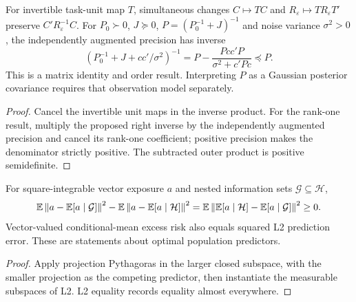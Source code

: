 \begin{theorem}\label{thm:task-precision}
  \leanok
  For invertible task-unit map $T$, simultaneous changes
  $C\mapsto TC$ and $R_\varepsilon\mapsto TR_\varepsilon T'$
  preserve $C'R_\varepsilon^{-1}C$.
  For $P_0\succ0$, $J\succeq0$, $P=(P_0^{-1}+J)^{-1}$ and noise variance
  $\sigma^2>0$, the independently augmented precision has inverse
  \[
    (P_0^{-1}+J+cc'/\sigma^2)^{-1}
    =P-\frac{Pcc'P}{\sigma^2+c'Pc}\preceq P.
  \]
  This is a matrix identity and order result. Interpreting $P$ as a Gaussian
  posterior covariance requires that observation model separately.
\end{theorem}
\begin{proof}\leanok
  Cancel the invertible unit maps in the inverse product. For the rank-one
  result, multiply the proposed right inverse by the independently augmented
  precision and cancel its rank-one coefficient; positive precision makes the
  denominator strictly positive. The subtracted outer product is positive
  semidefinite.
\end{proof}

\begin{theorem}\label{thm:information-enrichment}
  \leanok
  For square-integrable vector exposure $a$ and nested information sets
  $\mathcal G\subseteq\mathcal H$,
  \[
    \mathbb E\left\lVert a-\mathbb E[a\mid\mathcal G]\right\rVert^2
    -\mathbb E\left\lVert a-\mathbb E[a\mid\mathcal H]\right\rVert^2
    =\mathbb E\left\lVert\mathbb E[a\mid\mathcal H]-\mathbb E[a\mid\mathcal G]\right\rVert^2
    \ge0.
  \]
  Vector-valued conditional-mean excess risk also equals squared L2
  prediction error. These are statements about optimal population predictors.
\end{theorem}
\begin{proof}\leanok
  Apply projection Pythagoras in the larger closed subspace, with the smaller
  projection as the competing predictor, then instantiate the measurable
  subspaces of L2. L2 equality records equality almost everywhere.
\end{proof}

